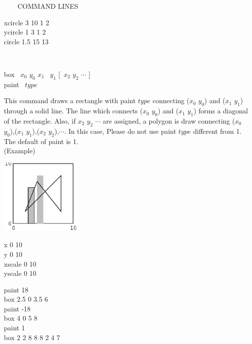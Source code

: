 \begin{qsection}{\ ~~~COMMAND LINES}
\begin{minipage}[t]{9cm}
\begin{minipage}[b]{4.5cm}
\vspace*{3mm}
xcircle 3 10 1 2\\
ycircle 1 3 1 2\\
circle  1.5 15 13\\
\vspace*{7mm}
\end{minipage}
\end{minipage}\\

\begin{minipage}[t]{5.5cm}
box ~$x_0$ $y_0$ $x_1$ ~$y_1$ [~$x_2$ $y_2$ $\cdots$ ]\\
paint ~$type$
\end{minipage}
\begin{minipage}[t]{9cm}
This command draws a rectangle with paint $type$
connecting ($x_0$ $y_0$) and ($x_1$ $y_1$) through a solid line.
The line which connects ($x_0$ $y_0$) and ($x_1$ $y_1$) forms
a diagonal of the rectangle.
Also, if $x_2$ $y_2$ $\cdots$ are assigned, a polygon is draw connecting
($x_0$ $y_0$),($x_1$ $y_1$),($x_2$ $y_2$),$\cdots$.
In this case, Please do not use paint $type$ different from 1.
The default of paint is 1.\\

(Example)\\
\begin{minipage}[t]{4.3cm}
 \includegraphics[width=4cm]{fig/box.eps}
\end{minipage}
\begin{minipage}[b]{4.5cm}
\baselineskip 5pt
x 0 10\\
y 0 10\\
xscale 0 10\\
yscale 0 10

\vspace*{3mm}
paint 18\\
box 2.5 0 3.5 6\\
paint -18 \\
box 4 0 5 8\\
paint 1\\
box  2 2 8 8 8 2 4 7
\end{minipage}
\end{minipage}\\


\end{qsection}
